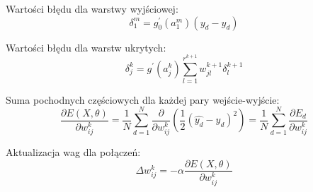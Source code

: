 \documentclass[a4paper,12pt]{article}
\numberwithin{figure}{section}
\begin{document}
    \smallskip

    \noindent
    \begin{minipage}[H]{\textwidth}
        \setlength\parindent{17pt} Wartości błędu dla warstwy wyjściowej: \\
        \begin{equation}
            \label{eq:final_layer_error_term}
            \delta_1^m = g_0^{\prime} (a_1^m) (\widehat{y_d} - y_d)
        \end{equation}
    \end{minipage}

    \smallskip

    \noindent
    \begin{minipage}[H]{\textwidth}
        \setlength\parindent{17pt} Wartości błędu dla warstw ukrytych: \\
        \begin{equation}
            \label{eq:hidden_layer_error_term}
            \delta_j^k = g^{\prime} (a_j^k) \displaystyle\sum_{l=1}^{r^{k+1}} w_{jl}^{k+1} \delta_l^{k+1}
        \end{equation}
    \end{minipage}

    \smallskip

    \noindent
    \begin{minipage}[H]{\textwidth}
        \setlength\parindent{17pt} Suma pochodnych częściowych dla każdej pary wejście-wyjście: \\
        \begin{equation}
            \label{eq:partial_derivatives_combination_for_input_output_pairs}
            \frac{\partial E(X,\theta)}{\partial w_{ij}^k} = \frac{1}{N} \displaystyle\sum_{d=1}^N \frac{\partial}{\partial w_{ij}^k} (\frac{1}{2}(\widehat{y_d} - y_d)^2) = \frac{1}{N} \displaystyle\sum_{d=1}^N \frac{\partial E_d}{\partial w_{ij}^k}
        \end{equation}
    \end{minipage}

    \smallskip

    \noindent
    \begin{minipage}[H]{\textwidth}
        \setlength\parindent{17pt} Aktualizacja wag dla połączeń: \\
        \begin{equation}
            \label{eq:updating_weights}
            \Delta w_{ij}^k = -\alpha \frac{\partial E(X,\theta)}{\partial w_{ij}^k}
        \end{equation}
    \end{minipage}
\end{document}
